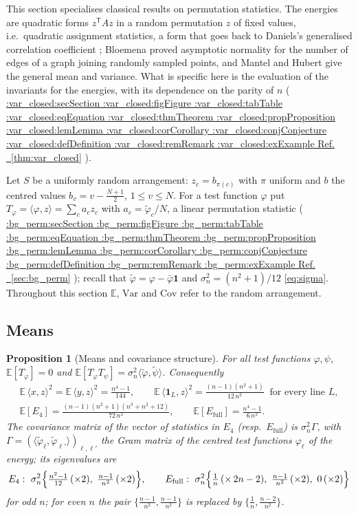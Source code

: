 \documentclass[11pt,a4paper]{article}
\makeatletter
\def\Cref@getprefix#1:#2\relax{#1}
\def\Cref@prefix@sec{sec}
\def\Cref@prefix@fig{fig}
\def\Cref@prefix@tab{tab}
\def\Cref@prefix@eq{eq}
\def\Cref@prefix@thm{thm}
\def\Cref@prefix@prop{prop}
\def\Cref@prefix@lem{lem}
\def\Cref@prefix@cor{cor}
\def\Cref@prefix@conj{conj}
\def\Cref@prefix@def{def}
\def\Cref@prefix@rem{rem}
\def\Cref@prefix@ex{ex}
\def\Cref@type@cap#1{%
  \edef\Cref@tmp{#1}%
  \ifx\Cref@tmp\Cref@prefix@sec Section%
  \else\ifx\Cref@tmp\Cref@prefix@fig Figure%
  \else\ifx\Cref@tmp\Cref@prefix@tab Table%
  \else\ifx\Cref@tmp\Cref@prefix@eq Equation%
  \else\ifx\Cref@tmp\Cref@prefix@thm Theorem%
  \else\ifx\Cref@tmp\Cref@prefix@prop Proposition%
  \else\ifx\Cref@tmp\Cref@prefix@lem Lemma%
  \else\ifx\Cref@tmp\Cref@prefix@cor Corollary%
  \else\ifx\Cref@tmp\Cref@prefix@conj Conjecture%
  \else\ifx\Cref@tmp\Cref@prefix@def Definition%
  \else\ifx\Cref@tmp\Cref@prefix@rem Remark%
  \else\ifx\Cref@tmp\Cref@prefix@ex Example%
  \else Ref.%
  \fi\fi\fi\fi\fi\fi\fi\fi\fi\fi\fi\fi
}
\DeclareRobustCommand{\Cref}[1]{%
  \begingroup
  \edef\Cref@label{#1}%
  \edef\Cref@prefix{\expandafter\Cref@getprefix\Cref@label:\relax}%
  \hyperref[#1]{\Cref@type@cap{\Cref@prefix}~\ref*{#1}}%
  \endgroup
}
\theoremstyle{plain}
\newtheorem{proposition}[theorem]{Proposition}
\theoremstyle{definition}
\theoremstyle{remark}
\newcommand{\Cov}{\mathrm{Cov}}
\newcommand{\Var}{\mathrm{Var}}
\newcommand{\Efull}{E_{\mathrm{full}}}
\newcommand{\Efour}{E_4}
\newcommand{\E}{\mathbb{E}}
\makeatother
\begin{document}
This section specialises classical results on permutation statistics.
The energies are quadratic forms $z^{\mathsf T}Az$ in a random permutation $z$ of fixed values, i.e.\ quadratic assignment statistics, a form that goes back to Daniels's generalised correlation coefficient \cite{daniels1944}; Bloemena \cite{bloemena1964} proved asymptotic normality for the number of edges of a graph joining randomly sampled points, and Mantel \cite{mantel1967} and Hubert \cite{hubert1987assignment} give the general mean and variance.
What is specific here is the evaluation of the invariants for the energies, with its dependence on the parity of $n$ (\Cref{thm:var_closed}).

Let $S$ be a uniformly random arrangement: $z_c=b_{\pi(c)}$ with $\pi$ uniform and $b$ the centred values $b_v=v-\frac{N+1}2$, $1\le v\le N$.
For a test function $\varphi$ put $T_\varphi=\langle\varphi,z\rangle=\sum_ca_cz_c$ with $a_c=\tilde\varphi_c/N$, a linear permutation statistic (\Cref{sec:bg_perm}); recall that $\tilde\varphi=\varphi-\bar\varphi\mathbf 1$ and $\sigma_n^2=(n^2+1)/12$ \eqref{eq:sigma}.
Throughout this section $\E$, $\Var$ and $\Cov$ refer to the random arrangement.

\subsection{Means}

\begin{proposition}[Means and covariance structure]
\label{prop:random_energy_moments}
For all test functions $\varphi,\psi$, $\E[T_\varphi]=0$ and $\E[T_\varphi T_\psi]=\sigma_n^2\langle\tilde\varphi,\tilde\psi\rangle$.
Consequently
\begin{gather}
\E\,\langle x,z\rangle^2=\E\,\langle y,z\rangle^2=\frac{n^4-1}{144},\qquad
\E\,\langle\mathbf 1_L,z\rangle^2=\frac{(n-1)(n^2+1)}{12\,n^2}\ \text{ for every line }L,
\label{eq:single_terms}\\
\E[\Efour]=\frac{(n-1)(n^2+1)(n^3+n^2+12)}{72\,n^2},\qquad
\E[\Efull]=\frac{n^4-1}{6\,n^2}.
\label{eq:mean_low}
\end{gather}
The covariance matrix of the vector of statistics in $\Efour$ (resp.\ $\Efull$) is $\sigma_n^2\Gamma$, with $\Gamma=(\langle\tilde\varphi_\ell,\tilde\varphi_{\ell'}\rangle)_{\ell,\ell'}$ the Gram matrix of the centred test functions $\varphi_\ell$ of the energy; its eigenvalues are
\begin{equation}
\Efour:\ \sigma_n^2\Bigl\{\tfrac{n^2-1}{12}\,(\times2),\ \tfrac{n-1}{n^2}\,(\times2)\Bigr\},
\qquad
\Efull:\ \sigma_n^2\Bigl\{\tfrac1n\,(\times\,2n-2),\ \tfrac{n-1}{n^2}\,(\times2),\ 0\,(\times2)\Bigr\}
\label{eq:weights}
\end{equation}
for odd $n$; for even $n$ the pair $\{\tfrac{n-1}{n^2},\tfrac{n-1}{n^2}\}$ is replaced by $\{\tfrac1n,\tfrac{n-2}{n^2}\}$.
\end{proposition}
\end{document}
